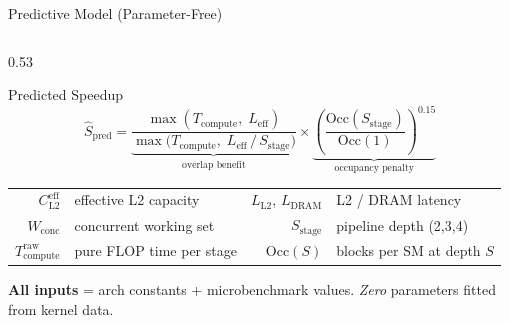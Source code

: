 \documentclass[aspectratio=169,10pt]{beamer}
\begin{document}
\begin{frame}{Predictive Model (Parameter-Free)}
\begin{columns}[T]
\begin{column}{0.53\textwidth}
\vspace{0.2em}
\begin{block}{\small Predicted Speedup}
\vspace{-0.5em}
\[
\widehat{S}_{\text{pred}} = \underbrace{\frac{\max(T_{\text{compute}},\; L_{\text{eff}})}{\max\!\bigl(T_{\text{compute}},\; L_{\text{eff}}\,/\,S_{\text{stage}}\bigr)}}_{\text{overlap benefit}} \times \underbrace{\left(\frac{\text{Occ}(S_{\text{stage}})}{\text{Occ}(1)}\right)^{0.15}}_{\text{occupancy penalty}}
\]
\end{block}

\vspace{0.1em}
\scriptsize
\renewcommand{\arraystretch}{1.0}
\begin{tabular}{@{}r@{\;=\;}l@{\qquad}r@{\;=\;}l@{}}
$C_{\text{L2}}^{\text{eff}}$ & effective L2 capacity &
$L_{\text{L2}}$, $L_{\text{DRAM}}$ & L2 / DRAM latency \\
$W_{\text{conc}}$ & concurrent working set &
$S_{\text{stage}}$ & pipeline depth (2,3,4) \\
$T_{\text{compute}}^{\text{raw}}$ & pure FLOP time per stage &
$\text{Occ}(S)$ & blocks per SM at depth $S$ \\
\end{tabular}

\vspace{0.2em}
\centering
\scriptsize
\textbf{All inputs} = arch constants + microbenchmark values.\;
\emph{Zero} parameters fitted from kernel data.
\end{column}
\end{columns}
\end{frame}
\end{document}
